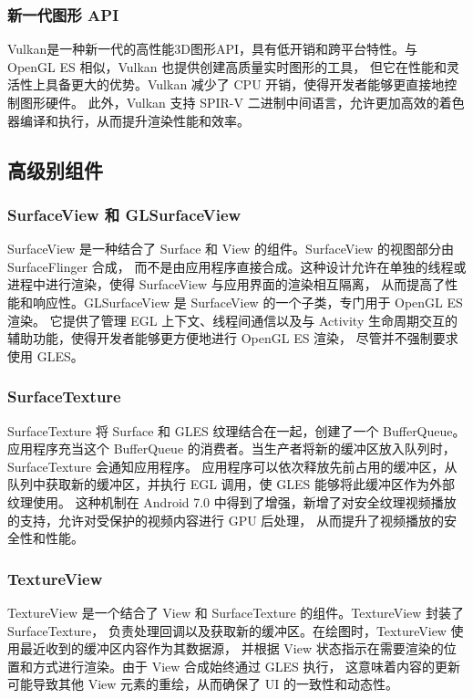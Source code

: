 \subsubsection{新一代图形 API}
Vulkan\cite{2017Vulkan,2017Getting}是一种新一代的高性能3D图形API，具有低开销和跨平台特性。与 OpenGL ES 相似，Vulkan 也提供创建高质量实时图形的工具，
但它在性能和灵活性上具备更大的优势。Vulkan 减少了 CPU 开销，使得开发者能够更直接地控制图形硬件。
此外，Vulkan 支持 SPIR-V 二进制中间语言，允许更加高效的着色器编译和执行，从而提升渲染性能和效率。

\subsection{高级别组件}

\subsubsection{SurfaceView 和 GLSurfaceView}
SurfaceView 是一种结合了 Surface 和 View 的组件。SurfaceView 的视图部分由 SurfaceFlinger 合成，
而不是由应用程序直接合成。这种设计允许在单独的线程或进程中进行渲染，使得 SurfaceView 与应用界面的渲染相互隔离，
从而提高了性能和响应性。GLSurfaceView 是 SurfaceView 的一个子类，专门用于 OpenGL ES 渲染。
它提供了管理 EGL 上下文、线程间通信以及与 Activity 生命周期交互的辅助功能，使得开发者能够更方便地进行 OpenGL ES 渲染，
尽管并不强制要求使用 GLES。

\subsubsection{SurfaceTexture}
SurfaceTexture 将 Surface 和 GLES 纹理结合在一起，创建了一个 BufferQueue。
应用程序充当这个 BufferQueue 的消费者。当生产者将新的缓冲区放入队列时，SurfaceTexture 会通知应用程序。
应用程序可以依次释放先前占用的缓冲区，从队列中获取新的缓冲区，并执行 EGL 调用，使 GLES 能够将此缓冲区作为外部纹理使用。
这种机制在 Android 7.0 中得到了增强，新增了对安全纹理视频播放的支持，允许对受保护的视频内容进行 GPU 后处理，
从而提升了视频播放的安全性和性能。

\subsubsection{TextureView}
TextureView 是一个结合了 View 和 SurfaceTexture 的组件。TextureView 封装了 SurfaceTexture，
负责处理回调以及获取新的缓冲区。在绘图时，TextureView 使用最近收到的缓冲区内容作为其数据源，
并根据 View 状态指示在需要渲染的位置和方式进行渲染。由于 View 合成始终通过 GLES 执行，
这意味着内容的更新可能导致其他 View 元素的重绘，从而确保了 UI 的一致性和动态性。

